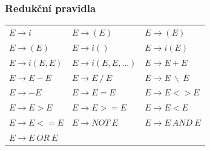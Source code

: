 \subsubsection{Redukční pravidla}

\begin{table}[htbp]
\centering
\label{Redukční pravidla}
\begin{tabular}{lll}
    $E \to i$ &  $E \to (E)$ & $E \to (E)$ \\
    $E \to (E)$ & $E \to i()$ & $E \to i(E)$\\
    $E \to i(E, E)$ & $E \to i(E, E, ...)$ &  $E \to E + E$\\
    $E \to E - E$ & $E \to E ~ / ~ E$ & $E \to E ~ \backslash ~ E$\\
    $E \to - E$ &  $E \to E = E$ & $E \to E <> E$\\
    $E \to E > E$ & $E \to E >= E$ & $E \to E < E$\\
    $E \to E <= E$ & $E \to NOT ~ E$ & $E \to E ~ AND ~ E$\\
    $E \to E ~ OR ~ E$ & & \\
\end{tabular}
\end{table}


